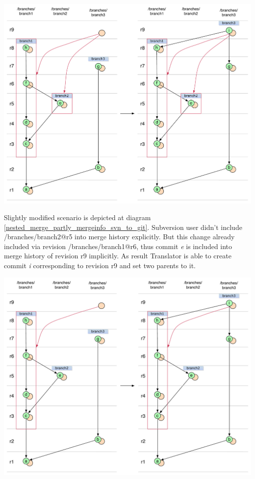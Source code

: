 \begin{center}
\includegraphics[width=\textwidth]{img/diagrams/nested_merge_full_mergeinfo_svn_to_git.pdf}%
\label{nested_merge_full_mergeinfo_svn_to_git}%
\end{center}

Slightly modified scenario is depicted at diagram \ref{nested_merge_partly_mergeinfo_svn_to_git}. Subversion user didn't include /branches/branch2@r5 into merge history explicitly. But this change already included via revision /branches/branch1@r6, thus commit \emph{e} is included into merge history of revision r9 implicitly. As result Translator is able to create commit \emph{i} corresponding to revision r9 and set two parents to it.

\begin{center}
\includegraphics[width=\textwidth]{img/diagrams/nested_merge_partly_mergeinfo_svn_to_git.pdf}%
\label{nested_merge_partly_mergeinfo_svn_to_git}%
\end{center}

